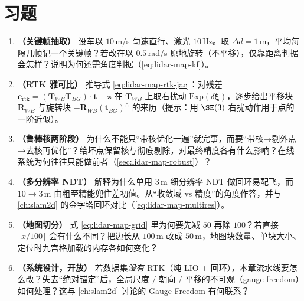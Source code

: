 \section*{习题}
\begin{enumerate}
  \item \textbf{（关键帧抽取）} 设车以 $10$\,m/s 匀速直行、激光 $10$\,Hz。取 $\Delta d=1$\,m，平均每隔几帧记一个关键帧？若改在以 $0.5$\,rad/s 原地旋转（不平移），仅靠距离判据会怎样？说明为何还需角度判据（\cref{eq:lidar-map-kf}）。
  \item \textbf{（RTK 雅可比）} 推导式 \eqref{eq:lidar-map-rtk-jac}：对残差 $\mathbf{e}_{\text{rtk}}=(\mathbf{T}_{WB}\mathbf{T}_{BG})\!\cdot\!\mathbf{t}-\mathbf{z}$ 在 $\mathbf{T}_{WB}$ 上取右扰动 $\mathrm{Exp}(\delta\boldsymbol{\xi})$，逐步给出平移块 $\mathbf{R}_{WB}$ 与旋转块 $-\mathbf{R}_{WB}(\mathbf{t}_{BG})^\wedge$ 的来历（提示：用 $\SE(3)$ 右扰动作用于点的一阶近似）。
  \item \textbf{（鲁棒核两阶段）} 为什么不能只“带核优化一遍”就完事，而要“带核→剔外点→去核再优化”？给坏点保留核与彻底剔除，对最终精度各有什么影响？在线系统为何往往只能做前者（\cref{sec:lidar-map-robust}）？
  \item \textbf{（多分辨率 NDT）} 解释为什么单用 $3$\,m 细分辨率 NDT 做回环易配飞，而 $10\!\to\!3$\,m 由粗至精能兜住差初值。从“收敛域 vs 精度”的角度作答，并与 \cref{ch:slam2d} 的金字塔回环对比（\cref{eq:lidar-map-multires}）。
  \item \textbf{（地图切分）} 式 \eqref{eq:lidar-map-grid} 里为何要先减 $50$ 再除 $100$？若直接 $\lfloor x/100\rfloor$ 会有什么不同？把边长从 $100$\,m 改成 $50$\,m，地图块数量、单块大小、定位时九宫格加载的内存各如何变化？
  \item \textbf{（系统设计，开放）} 若数据集\emph{没有} RTK（纯 LIO + 回环），本章流水线要怎么改？失去“绝对锚定”后，全局尺度 / 朝向 / 平移的不可观（gauge freedom）如何处理？这与 \cref{ch:slam2d} 讨论的 Gauge Freedom 有何联系？
\end{enumerate}
